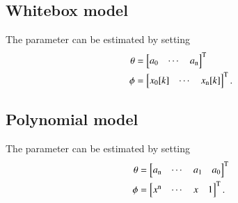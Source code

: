 \documentclass[10pt]{article}
\begin{document}
\subsection{Whitebox model}
The parameter can be estimated by setting
\begin{align}
\theta&=\begin{bmatrix}a_0 & \cdots & a_{\rm n} \end{bmatrix}^{\rm T}\\
\phi&=\begin{bmatrix}x_0[k] & \cdots & x_{\rm n}[k]\end{bmatrix}^{\rm T}.
\end{align}

\subsection{Polynomial model} 
The parameter can be estimated by setting
\begin{align}
\theta&=\begin{bmatrix}a_{\rm n} & \cdots & a_1 & a_0 \end{bmatrix}^{\rm T}\\
\phi&=\begin{bmatrix}x^{\rm n} & \cdots & x & 1 \end{bmatrix}^{\rm T}.
\end{align}
\end{document}
